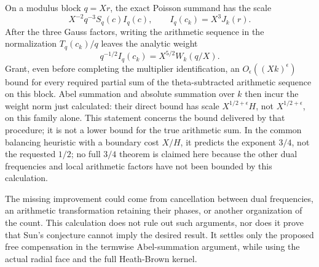 On a modulus block $q=Xr$, the exact Poisson summand has the scale
\[
 X^{-2}q^{-3}S_q(c)I_q(c),\qquad I_q(c_k)=X^3J_k(r).
\]
After the three Gauss factors, writing the arithmetic sequence in the
normalization $T_q(c_k)/q$ leaves the analytic weight
\[
 q^{-1/2}I_q(c_k)=X^{5/2}W_k(q/X).
\]
Grant, even before completing the multiplier identification, an
$O_\epsilon((Xk)^\epsilon)$ bound for every required partial sum of
the theta-subtracted arithmetic sequence on this block.  Abel
summation and absolute summation over $k$ then incur the weight norm
just calculated: their direct bound has scale
$X^{1/2+\epsilon}H$, not $X^{1/2+\epsilon}$, on this family alone.
This statement concerns the bound delivered by that procedure; it is
not a lower bound for the true arithmetic sum.  In the common
balancing heuristic with a boundary cost $X/H$, it predicts the
exponent $3/4$, not the requested $1/2$; no full $3/4$ theorem is
claimed here because the other dual frequencies and local
arithmetic factors have not been bounded by this calculation.

The missing improvement could come from cancellation between dual
frequencies, an arithmetic transformation retaining their phases,
or another organization of the count.  This calculation does not
rule out such arguments, nor does it prove that Sun's conjecture
cannot imply the desired result.  It settles only the proposed free
compensation in the termwise Abel-summation argument, while using
the actual radial face and the full Heath-Brown kernel.
